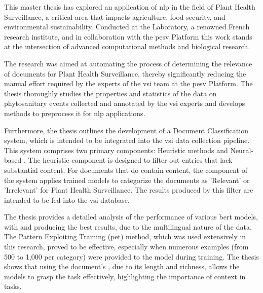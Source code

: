 \label{09_conclusion}





This master thesis has explored an application of \gls{nlp} in the field of Plant Health Surveillance, a critical area that impacts agriculture, food security, and environmental sustainability. Conducted at the \INRAE{} Laboratory, a renowned French research institute, and in collaboration with the \gls{pesv} Platform this work stands at the intersection of advanced computational methods and biological research.

The research was aimed at automating the process of determining the relevance of documents for Plant Health Surveillance, thereby significantly reducing the manual effort required by the experts of the \gls{vsi} team at the \gls{pesv} Platform. The thesis thoroughly studies the properties and statistics of the data on phytosanitary events collected and annotated by the \gls{vsi} experts and develops methods to preprocess it for \gls{nlp} applications.

Furthermore, the thesis outlines the development of a Document Classification system, which is intended to be integrated into the \gls{vsi} data collection pipeline. This system comprises two primary components: Heuristic methods and Neural-based \textclassification{}. 
The heuristic component is designed to filter out entries that lack substantial content. For documents that do contain content, the \textclassification{} component of the system applies trained models to categorize the documents as 'Relevant' or 'Irrelevant' for Plant Health Surveillance. The results produced by this filter are intended to be fed into the \gls{vsi} database.

The thesis provides a detailed analysis of the performance of various \gls{bert} models, with \bertmultilingual{} and \bertxlmroberta{} producing the best results, due to the multilingual nature of the data. The Pattern Exploiting Training (\gls{pet}) method, which was used extensively in this research, proved to be effective, especially when numerous examples (from 500 to 1,000 per category) were provided to the model during training. 
The thesis shows that using the document's \trafilaturaFulltext{}, due to its length and richness, allows the models to grasp the task effectively, highlighting the importance of context in \textclassification{} tasks.

